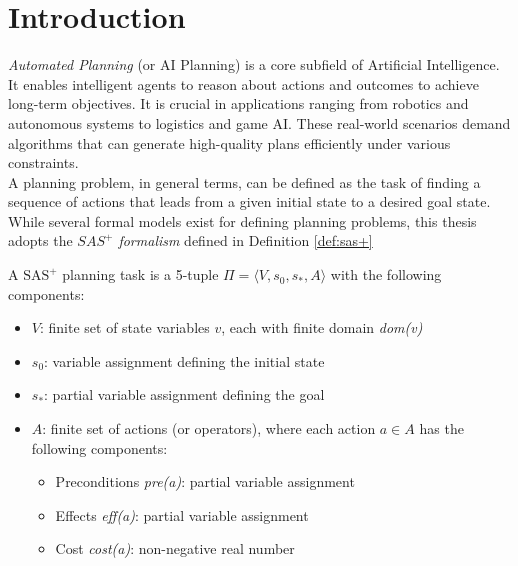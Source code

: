 \chapter{Introduction}
\label{ch:intro}
\textit{Automated Planning} (or AI Planning) is a core subfield of Artificial Intelligence.
It enables intelligent agents to reason about actions and outcomes to
achieve long-term objectives. It is crucial in applications ranging from robotics and autonomous
systems to logistics and game AI. These real-world scenarios demand algorithms that can generate
high-quality plans efficiently under various constraints.\\
A planning problem, in general terms, can be defined as the task of finding a sequence
of actions that leads from a given initial state to a desired goal state.
While several formal models exist for defining planning problems, this thesis
adopts the \textit{$SAS^+$ formalism} defined in Definition \ref{def:sas+}

\begin{definition}
	\label{def:sas+}
	A $\text{SAS}^+$ planning task is a 5-tuple $\Pi = \langle V, s_0, s_*, A \rangle$ with
	the following components:
	\begin{itemize}
		\item \(V\): finite set of state variables \(v\),
		      each with finite domain \textit{dom(v)}
		\item \(s_0\): variable assignment defining the initial state
		\item \(s_*\): partial variable assignment defining the goal
		\item \(A\): finite set of actions (or operators),
		      where each action $a \in A$ has the following components:
		      \begin{itemize}
			      \item Preconditions \textit{pre(a)}: partial variable assignment
			      \item Effects \textit{eff(a)}: partial variable assignment
			      \item Cost \textit{cost(a)}: non-negative real number
		      \end{itemize}
	\end{itemize}
\end{definition}

